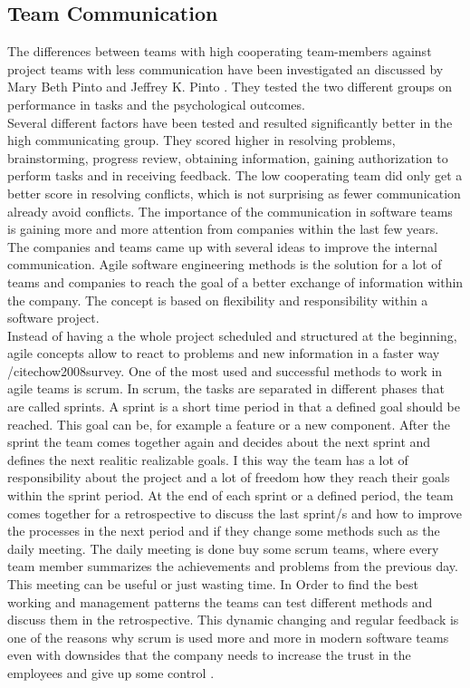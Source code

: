 \subsection{Team Communication}
The differences between teams with high cooperating team-members against project teams with less communication have been investigated an discussed by Mary Beth Pinto and Jeffrey K. Pinto \cite{pinto1990project}. They tested the two different groups on performance in tasks and the psychological outcomes.\\ 
Several different factors have been tested and resulted significantly better in the high communicating group. They scored higher in resolving problems, brainstorming, progress review, obtaining information, gaining authorization to perform tasks and in receiving feedback. The low cooperating team did only get a better score in resolving conflicts, which is not surprising as fewer communication already avoid conflicts. 
\bigbreak
The importance of the communication in software teams is gaining more and more attention from companies within the last few years. The companies and teams came up with several ideas to improve the internal communication. 
Agile software engineering methods is the solution for a lot of teams and companies to reach the goal of a better exchange of information within the company. The concept is based on flexibility and responsibility within a software project.\\
Instead of having a the whole project scheduled and structured at the beginning, agile concepts allow to react to problems and new information in a faster way /cite{chow2008survey}. One of the most used and successful methods to work in agile teams is scrum.
\bigbreak
In scrum, the tasks are separated in different phases that are called sprints. A sprint is a short time period in that a defined goal should be reached. This goal can be, for example a feature or a new component. After the sprint the team comes together again and decides about the next sprint and defines the next realitic realizable goals. I this way the team has a lot of responsibility about the project and a lot of freedom how they reach their goals within the sprint period. At the end of each sprint or a defined period, the team comes together for a retrospective to discuss the last sprint/s and how to improve the processes in the next period and if they change some methods such as the daily meeting. The daily meeting is done buy some scrum teams, where every team member summarizes the achievements and problems from the previous day. This meeting can be useful or just wasting time. In Order to find the best working and management patterns the teams can test different methods and discuss them in the retrospective. This dynamic changing and regular feedback is one of the reasons why scrum is used more and more in modern software teams \cite{rising2000scrum} \cite{moe2010teamwork} even with downsides that the company needs to increase the trust in the employees and give up some control \cite{ramesh2006can}.
